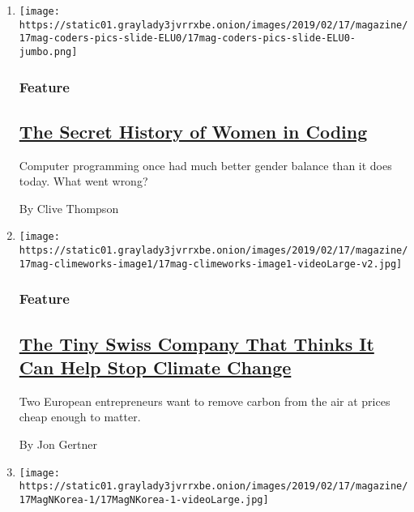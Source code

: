 \begin{enumerate}
\def\labelenumi{\arabic{enumi}.}
\item
  \texttt{[image: https://static01.graylady3jvrrxbe.onion/images/2019/02/17/magazine/17mag-coders-pics-slide-ELU0/17mag-coders-pics-slide-ELU0-jumbo.png]}

  \hypertarget{feature}{%
  \subsubsection{Feature}\label{feature}}

  \hypertarget{the-secret-history-of-women-in-coding}{%
  \subsection{\texorpdfstring{\href{/2019/02/13/magazine/women-coding-computer-programming.html}{The
  Secret History of Women in
  Coding}}{The Secret History of Women in Coding}}\label{the-secret-history-of-women-in-coding}}

  Computer programming once had much better gender balance than it does
  today. What went wrong?

  By Clive Thompson
\item
  \texttt{[image: https://static01.graylady3jvrrxbe.onion/images/2019/02/17/magazine/17mag-climeworks-image1/17mag-climeworks-image1-videoLarge-v2.jpg]}

  \hypertarget{feature-1}{%
  \subsubsection{Feature}\label{feature-1}}

  \hypertarget{the-tiny-swiss-company-that-thinks-it-can-help-stop-climate-change}{%
  \subsection{\texorpdfstring{\href{/2019/02/12/magazine/climeworks-business-climate-change.html}{The
  Tiny Swiss Company That Thinks It Can Help Stop Climate
  Change}}{The Tiny Swiss Company That Thinks It Can Help Stop Climate Change}}\label{the-tiny-swiss-company-that-thinks-it-can-help-stop-climate-change}}

  Two European entrepreneurs want to remove carbon from the air at
  prices cheap enough to matter.

  By Jon Gertner
\item
  \texttt{[image: https://static01.graylady3jvrrxbe.onion/images/2019/02/17/magazine/17MagNKorea-1/17MagNKorea-1-videoLarge.jpg]}


\end{enumerate}
